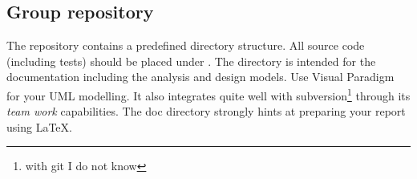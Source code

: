 




\subsection{Group repository}
The
repository contains a predefined directory structure. All source 
code (including tests) should be placed under . The 
directory is intended for the documentation including the analysis and
design models. Use Visual Paradigm for your UML modelling. It also
integrates quite well with subversion\footnote{with git I do not know} through its \textit{team work}
capabilities. The doc directory strongly hints at preparing your
report using \LaTeX.

